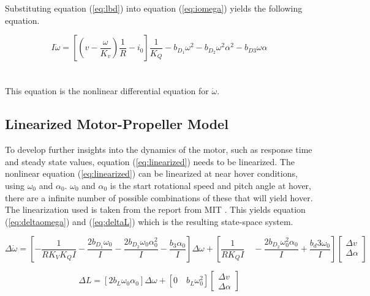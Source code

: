 Substituting equation (\ref{eq:lbd}) into equation (\ref{eq:iomega}) yields the following equation.

\begin{equation}
    \label{eq:linearized}
    I\dot{\omega} = \left[ \left(v - \frac{\omega}{K_v}\right) \frac{1}{R} - i_0 \right]\frac{1}{K_Q} - b_{D_1}\omega^2 - b_{D_2}\omega^2\alpha^2-b_{D3}\omega\alpha
\end{equation}
\\\\
This equation is the nonlinear differential equation for $\dot\omega$.


\newpage

\subsection{Linearized Motor-Propeller Model}

To develop further insights into the dynamics of the motor, such as response time and steady state values, equation (\ref{eq:linearized}) needs to be linearized. The nonlinear equation (\ref{eq:linearized}) can be linearized at near hover conditions, using $\omega_0$ and $\alpha_0$. $\omega_0$ and $\alpha_0$ is the start rotational speed and pitch angle at hover, there are a infinite number of possible combinations of these that will yield hover. The linearization used is taken from the report from MIT \cite{MITvpp}. This yields equation (\ref{eq:deltaomega}) and (\ref{eq:deltaL}) which is the resulting state-space system. 

\begin{equation}
\label{eq:deltaomega}
    \Delta\dot{\omega} = \left[-\frac{1}{RK_VK_QI}-\frac{2b_D_1\omega_0}{I}-\frac{2b_D_2\omega_0\alpha_0^2}{I}-\frac{b_3\alpha_0}{I}\right]\Delta\omega + \left[\frac{1}{RK_QI}\quad - \frac{2b_D_2\omega_0^2\alpha_0}{I} + \frac{b_d3\omega_0}{I}  \right] \begin{bmatrix}
       \Delta v            \\[0.2em]
       \Delta\alpha \\[0.2em]
     \end{bmatrix}
\end{equation}

\begin{equation}
\label{eq:deltaL}
    \Delta L = \left[2b_L\omega_0\alpha_0 \right]\Delta\omega + \left[0\quad b_L\omega_0^2\right]
    \begin{bmatrix}
        \Delta v \\
        \Delta\alpha
    \end{bmatrix}
\end{equation}

